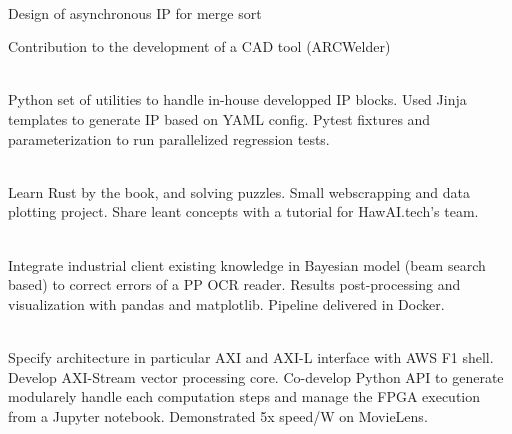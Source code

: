 \documentclass[a4paper]{MagicalCV}
\begin{document}
\begin{minipage}[t]{0.67\textwidth}
 \\
\vspace{\topsep} %
\begin{tightemize}
\item Design of asynchronous IP for merge sort
\item Contribution to the development of a CAD tool (ARCWelder)
\end{tightemize}
\sectionsep



 \\
Python set of utilities to handle in-house developped IP blocks.
Used Jinja templates to generate IP based on YAML config. Pytest fixtures
and parameterization to run parallelized regression tests.
\sectionsep

 \\
Learn Rust by the book, and solving puzzles. Small webscrapping and data plotting
project. Share leant concepts with a tutorial for HawAI.tech's team.
\sectionsep

 \\
Integrate industrial client existing knowledge in Bayesian model (beam search
based) to correct errors of a PP OCR reader. Results post-processing and visualization
with pandas and matplotlib. Pipeline delivered in Docker.
\sectionsep

 \\
Specify architecture in particular AXI and AXI-L interface with AWS F1 shell.
Develop AXI-Stream vector processing core. Co-develop Python API to generate
modularely handle each computation steps and manage the FPGA execution from a
Jupyter notebook. Demonstrated 5x speed/W on MovieLens.
\sectionsep

\end{minipage}
\end{document}
